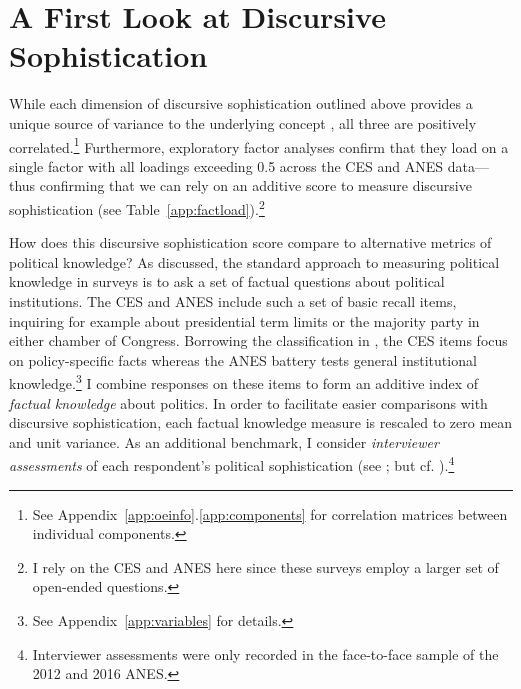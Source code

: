 \section*{A First Look at Discursive Sophistication}

While each dimension of discursive sophistication outlined above provides a unique source of variance to the underlying concept \citep{luskin1987measuring}, all three are positively correlated.\footnote{See Appendix~\ref{app:oeinfo}.\ref{app:components} for correlation matrices between individual components.} Furthermore, exploratory factor analyses confirm that they load on a single factor with all loadings exceeding 0.5 across the CES and ANES data---thus confirming that we can rely on an additive score to measure discursive sophistication (see Table~\ref{app:factload}).\footnote{I rely on the CES and ANES here since these surveys employ a larger set of open-ended questions.}



How does this discursive sophistication score compare to alternative metrics of political knowledge? As discussed, the standard approach to measuring political knowledge in surveys is to ask a set of factual questions about political institutions. The CES and ANES include such a set of basic recall items, inquiring for example about presidential term limits or the majority party in either chamber of Congress. Borrowing the classification in \citet{barabas2014question}, the CES items focus on policy-specific facts whereas the ANES battery tests general institutional knowledge.\footnote{See Appendix~\ref{app:variables} for details.} I combine responses on these items to form an additive index of \textit{factual knowledge} about politics. In order to facilitate easier comparisons with discursive sophistication, each factual knowledge measure is rescaled to zero mean and unit variance. As an additional benchmark, I consider \textit{interviewer assessments} of each respondent's political sophistication (see \citealt{bartels2005homer}; but cf. \citealt{ryan2011accuracy}).\footnote{Interviewer assessments were only recorded in the face-to-face sample of the 2012 and 2016 ANES.}

